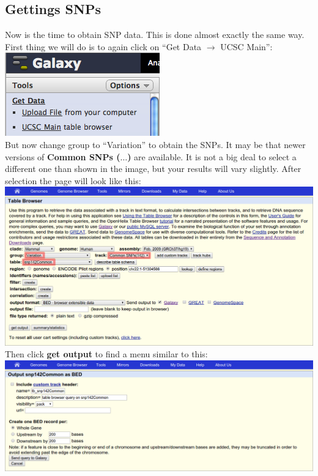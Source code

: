 \documentclass[11pt,a4paper]{article}
\begin{document}
\subsection{Gettings SNPs}
Now is the time to obtain SNP data. This is done almost exactly the same way. First thing we will do is to again click on ``Get Data $\rightarrow$ UCSC Main'':\\
\includegraphics[scale=0.65]{figures/101_01}\\
But now change group to ``Variation'' to obtain the SNPs. It may be that newer versions of \textbf{Common SNPs ($\ldots$)} are available. It is not a big deal to select a different one than shown in the image, but your results will vary slightly. After selection the page will look like this:\\
\includegraphics[width=\textwidth]{figures/101_06}\\
Then click \textbf{get output} to find a menu similar to this:\\
\includegraphics[width=\textwidth]{figures/101_07}\\
\end{document}
